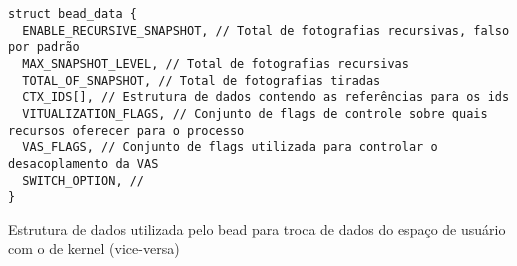 \begin{pseudocode}

\begin{lstlisting}[language=pseudocode, style=pseudocode]
struct bead_data {
  ENABLE_RECURSIVE_SNAPSHOT, // Total de fotografias recursivas, falso por padrão
  MAX_SNAPSHOT_LEVEL, // Total de fotografias recursivas
  TOTAL_OF_SNAPSHOT, // Total de fotografias tiradas
  CTX_IDS[], // Estrutura de dados contendo as referências para os ids
  VITUALIZATION_FLAGS, // Conjunto de flags de controle sobre quais recursos oferecer para o processo
  VAS_FLAGS, // Conjunto de flags utilizada para controlar o desacoplamento da VAS
  SWITCH_OPTION, // 
}

\end{lstlisting}

  \caption{Estrutura de dados utilizada pelo bead para troca de dados do espaço de usuário com o de kernel (vice-versa)}
  \label{alg:beadata}
\end{pseudocode}
